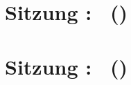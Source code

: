 \documentclass[ngerman]{article}
\begin{document}
\title{\lectype\ \lecfulltitle}

\date{\lecsemester}

\maketitle


\section*{Sitzung \sesnr: \sesfulltitle\ (\sesdate)}

\lipsum


\section*{Sitzung \sesnr: \sesfulltitle\ (\sesdate)}

\lipsum
\end{document}

